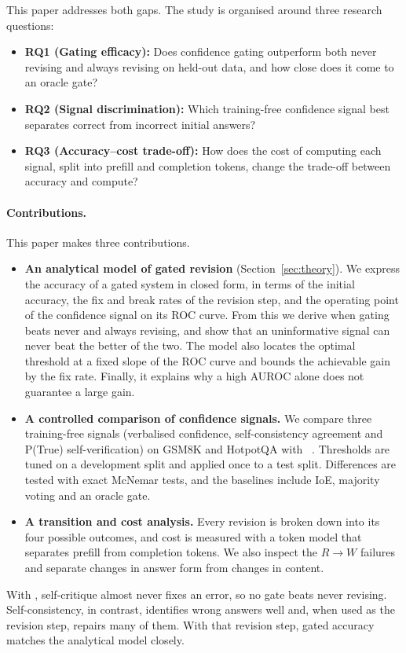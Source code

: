 This paper addresses both gaps. The study is organised around three research questions:
\begin{itemize}
    \item \textbf{RQ1 (Gating efficacy):} Does confidence gating outperform both never revising and always revising on held-out data, and how close does it come to an oracle gate?
    \item \textbf{RQ2 (Signal discrimination):} Which training-free confidence signal best separates correct from incorrect initial answers?
    \item \textbf{RQ3 (Accuracy--cost trade-off):} How does the cost of computing each signal, split into prefill and completion tokens, change the trade-off between accuracy and compute?
\end{itemize}

\paragraph{Contributions.} This paper makes three contributions.
\begin{itemize}
    \item \textbf{An analytical model of gated revision} (Section~\ref{sec:theory}). We express the accuracy of a gated system in closed form, in terms of the initial accuracy, the fix and break rates of the revision step, and the operating point of the confidence signal on its ROC curve. From this we derive when gating beats never and always revising, and show that an uninformative signal can never beat the better of the two. The model also locates the optimal threshold at a fixed slope of the ROC curve and bounds the achievable gain by the fix rate. Finally, it explains why a high AUROC alone does not guarantee a large gain.
    \item \textbf{A controlled comparison of confidence signals.} We compare three training-free signals (verbalised confidence, self-consistency agreement and P(True) self-verification) on GSM8K and HotpotQA with \modelA{}~\cite{qwen2025qwen25}. Thresholds are tuned on a development split and applied once to a test split. Differences are tested with exact McNemar tests, and the baselines include IoE, majority voting and an oracle gate.
    \item \textbf{A transition and cost analysis.} Every revision is broken down into its four possible outcomes, and cost is measured with a token model that separates prefill from completion tokens. We also inspect the $R\to W$ failures and separate changes in answer form from changes in content.
\end{itemize}
With \modelA{}, self-critique almost never fixes an error, so no gate beats never revising. Self-consistency, in contrast, identifies wrong answers well and, when used as the revision step, repairs many of them. With that revision step, gated accuracy matches the analytical model closely.

